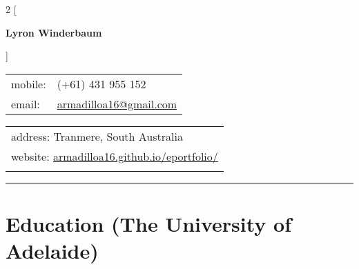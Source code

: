 \documentclass[a4paper,12pt]{report}
\begin{document}
 

\begin{multicols}{2}
[
\begin{center}
{\Large \textbf{Lyron Winderbaum}} \\ \vspace{4mm}
\end{center}
]

\begin{flushleft}
\begin{tabular}{ll}
mobile: & (+61) 431 955 152 \\
email: & \href{mailto:armadilloa16@gmail.com}{armadilloa16@gmail.com} \\
\end{tabular}
\end{flushleft}

\begin{flushright}
\begin{tabular}{l}
address: Tranmere, South Australia \\
website: \href{https://armadilloa16.github.io/eportfolio/}{armadilloa16.github.io/eportfolio/} \\
{}
\end{tabular}
\end{flushright}
\end{multicols}                                  

\vspace{-0.4cm}
\hrule
\vspace{-0.2cm}

%

\section*{Education (The University of Adelaide)}
\end{document}
